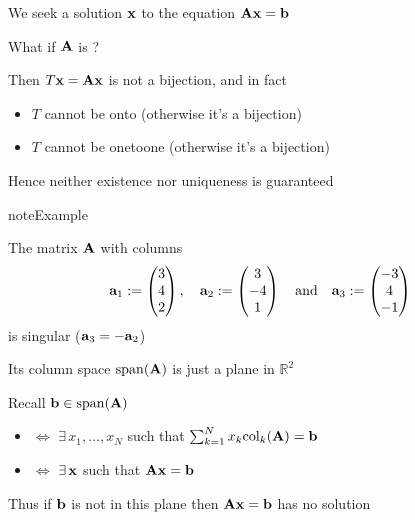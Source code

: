 \documentclass[letterpaper,10pt,english]{jupyterBook}
\begin{document}
\sphinxAtStartPar
We seek a solution \({\bf x}\) to the equation \({\bf A} {\bf x} = {\bf b}\)

\sphinxAtStartPar
What if \({\bf A}\) is ?

\sphinxAtStartPar
Then \(T{\bf x} = {\bf A} {\bf x}\) is not a bijection, and in fact
\begin{itemize}
\item {} 
\sphinxAtStartPar
\(T\) cannot be onto (otherwise it’s a bijection)

\item {} 
\sphinxAtStartPar
\(T\) cannot be one\sphinxhyphen{}to\sphinxhyphen{}one (otherwise it’s a bijection)

\end{itemize}

\sphinxAtStartPar
Hence neither existence nor uniqueness is guaranteed

\begin{sphinxadmonition}{note}{Example}

\sphinxAtStartPar
The matrix \({\bf A}\) with columns
\begin{equation*}
\begin{split}
%
{\bf a}_1 :=
\begin{pmatrix}
3 \\
4 \\
2
\end{pmatrix},
\quad
{\bf a}_2 :=
\begin{pmatrix}
3 \\
-4 \\
1
\end{pmatrix}
\quad \text{and} \quad
{\bf a}_3 :=
\begin{pmatrix}
-3 \\
4 \\
-1
\end{pmatrix}
%
\end{split}
\end{equation*}
\sphinxAtStartPar
is singular (\({\bf a}_3 = - {\bf a}_2\))

\sphinxAtStartPar
Its column space \(\mathrm{span}({\bf A})\) is just a plane in \(\mathbb{R}^2\)

\sphinxAtStartPar
Recall \({\bf b} \in \mathrm{span}({\bf A})\)
\begin{itemize}
\item {} 
\sphinxAtStartPar
\(\iff\) \(\exists \, x_1, \ldots, x_N\) such that \(\sum_{k=1}^N
x_k \mathrm{col}_k({\bf A}) = {\bf b}\)

\item {} 
\sphinxAtStartPar
\(\iff\) \(\exists \, {\bf x}\) such that \({\bf A} {\bf x} = {\bf b}\)

\end{itemize}

\sphinxAtStartPar
Thus if \({\bf b}\) is not in this plane then \({\bf A} {\bf x} = {\bf b}\) has no
solution
\end{sphinxadmonition}
\end{document}
